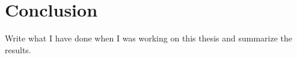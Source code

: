 \chapter{Conclusion}\label{ch:conclusion}
Write what I have done when I was working on this thesis and summarize the results.